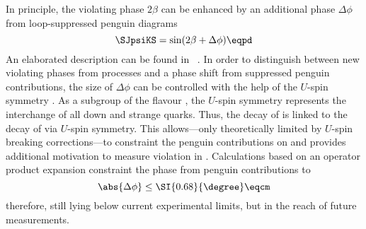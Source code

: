 In principle, the \CP violating phase $2\beta$ can be enhanced by an additional
phase $\Delta\phi$ from loop-suppressed penguin diagrams
%
\begin{equation}
  \SJpsiKS = \sin(2\beta +\Delta\phi) \eqpd
\end{equation}
%
An elaborated description can \eg be found in \Ref~\cite{wishahi:2013jt}. In
order to distinguish between new \CP violating phases from \BSM processes and a
phase shift from suppressed penguin contributions, the size of $\Delta\phi$ can
be controlled with the help of the $U$-spin symmetry \cite{Fleischer:1999nz}. As
a subgroup of the flavour , the $U$-spin symmetry represents the
interchange of all down and strange quarks. Thus, the decay of \BdToJpsiKS is
linked to the decay of \BsToJpsiKS via $U$-spin symmetry. This allows---only
theoretically limited by $U$-spin breaking corrections---to constraint the
penguin contributions on \sintwobeta \cite{DeBruyn:2014oga} and provides
additional motivation to measure \CP violation in \BsToJpsiKS
\cite{Aaij:2015tza}. Calculations based on an operator product expansion
constraint the phase from penguin contributions to \cite{Frings:2015eva}
%
\begin{equation}
  \abs{\Delta\phi} \leq \SI{0.68}{\degree} \eqcm
\end{equation}
%
therefore, still lying below current experimental limits, but in the reach of
future measurements.

